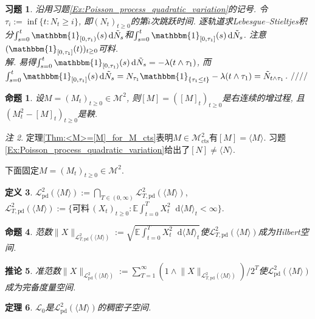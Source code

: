 \documentclass{ctexart}
\theoremstyle{definition}
\newtheorem{Def}{定义}[section]
\theoremstyle{remark}
\newtheorem{Rmk}[Def]{注}
\theoremstyle{plain}
\newtheorem{Prop}[Def]{命题}
\newtheorem{Thm}[Def]{定理}
\newtheorem{Cor}[Def]{推论}
\newtheorem{Ex}{习题}[section]
\newenvironment{Soln}{\vspace{1ex}\textbf{\\}{\color{red}\textit{解}}.\normalfont}{\color{red}\hfill$/\!/\!/\!/$\vspace{1ex}\par}
\newcommand{\1}{\mathbbm{1}}				%
\newcommand{\E}{\mathbb{E}}					%
\newcommand{\agp}[1]{\langle #1 \rangle}	%
\newcommand{\norm}[1]{\lVert#1\rVert}
\newcommand{\tint}{\textstyle\int\nolimits}
\renewcommand*{\d}{\mathop{}\!\mathrm{d}}	%
\begin{document}
\begin{Ex}\label{Ex:Poisson_process_integral}
沿用习题\ref{Ex:Poisson_process_quadratic_variation}的记号. 令$\tau_{i} := \inf\{ t : N_{t} \ge i \}$, 即$(N_{t})_{t \ge 0}$的第$i$次跳跃时间. 逐轨道求Lebesgue--Stieltjes积分$\int_{s=0}^{t} \1_{[0,\tau_{1})}(s) \d\tilde{N}_{s}$和$\int_{s=0}^{t} \1_{[0,\tau_{1}]}(s) \d\tilde{N}_{s}$. 注意$(\1_{[0,\tau_{1}]}(t))_{t \ge 0}$可料.
\begin{Soln}
易得$\int_{s=0}^{t} \1_{[0,\tau_{1})}(s) \d\tilde{N}_{s} = -\lambda(t\wedge\tau_{1})$, 而$\int_{s=0}^{t} \1_{[0,\tau_{1}]}(s) \d\tilde{N}_{s} = N_{\tau_{1}}\1_{\{\tau_{1}\le t\}} - \lambda(t\wedge\tau_{1}) = \tilde{N}_{t\wedge\tau_{1}}$.
\end{Soln}
\end{Ex}


\begin{Prop}
设$M = (M_{t})_{t \ge 0} \in \mathcal{M}^2$, 则$[M] = ([M]_{t})_{t \ge 0}$是右连续的增过程, 且$(M_{t}^{2}-[M]_{t})_{t \ge 0}$是鞅.
\end{Prop}
\begin{Rmk}
定理\ref{Thm:<M>=[M]_for_M_cts}表明$M \in \mathcal{M}^{2}_{\mathrm{cts}}$有$[M] = \agp{M}$. 习题\ref{Ex:Poisson_process_quadratic_variation}给出了$[N] \neq \agp{N}$.
\end{Rmk}

\WritingHand 下面固定$M = (M_{t})_{t \ge 0} \in \mathcal{M}^2$.

\begin{Def}
$\mathcal{L}^{2}_{\mathrm{pd}}(\agp{M}) := \bigcap_{T \in (0,\infty)} \mathcal{L}^{2}_{T,\mathrm{pd}}(\agp{M})$, 
$\mathcal{L}^{2}_{T,\mathrm{pd}}(\agp{M}) := \{ \text{可料}\,(X_{t})_{t \ge 0} : \E\tint_{t=0}^{T} X_{t}^{2} \d\agp{M}_{t} < \infty \}$.
\end{Def}

\begin{Prop}
范数$\norm{X}_{\mathcal{L}^{2}_{T,\mathrm{pd}}(\agp{M})} := \sqrt{\E\tint_{t=0}^{T} X_{t}^{2} \d\agp{M}_{t}}$使$\mathcal{L}^{2}_{T,\mathrm{pd}}(\agp{M})$成为Hilbert空间.
\end{Prop}
\begin{Cor}
准范数$\norm{X}_{\mathcal{L}^{2}_{\mathrm{pd}}(\agp{M})} := \sum_{T=1}^{\infty} (1\wedge\norm{X}_{\mathcal{L}^{2}_{T,\mathrm{pd}}(\agp{M})})/2^{T}$使$\mathcal{L}^{2}_{\mathrm{pd}}(\agp{M})$成为完备度量空间.
\end{Cor}

\begin{Thm}
$\mathcal{L}_{0}$是$\mathcal{L}^{2}_{\mathrm{pd}}(\agp{M})$的稠密子空间.
\end{Thm}
\end{document}
